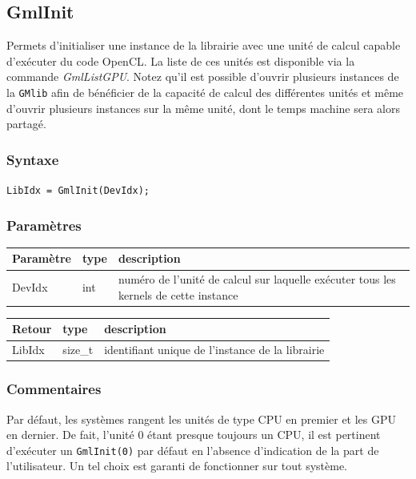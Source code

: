 \documentclass[a4paper,12pt]{article}
\begin{document}
\subsection{GmlInit}

Permets d'initialiser une instance de la librairie avec une unité de calcul capable d'exécuter du code OpenCL.
La liste de ces unités est disponible via la commande \emph{GmlListGPU}.
Notez qu'il est possible d'ouvrir plusieurs instances de la {\tt GMlib} afin de bénéficier de la capacité de calcul des différentes unités et même d'ouvrir plusieurs instances sur la même unité, dont le temps machine sera alors partagé.

\subsubsection*{Syntaxe}

{\tt LibIdx = GmlInit(DevIdx);}

\subsubsection*{Paramètres}

\begin{tabular}{|m{2cm}|m{1.5cm}|m{10.5cm}|}
\hline
Paramètre  & type   & description \\
\hline
DevIdx     & int    & numéro de l'unité de calcul sur laquelle exécuter tous les kernels de cette instance \\
\hline
\end{tabular}

\medskip

\begin{tabular}{|m{2cm}|m{1.5cm}|m{10.5cm}|}
\hline
Retour     & type    & description \\
\hline
LibIdx     & size\_t & identifiant unique de l'instance de la librairie \\
\hline
\end{tabular}

\subsubsection*{Commentaires}
Par défaut, les systèmes rangent les unités de type CPU en premier et les GPU en dernier.
De fait, l'unité 0 étant presque toujours un CPU, il est pertinent d'exécuter un {\tt GmlInit(0)} par défaut en l'absence d'indication de la part de l'utilisateur. Un tel choix est garanti de fonctionner sur tout système.
\end{document}
